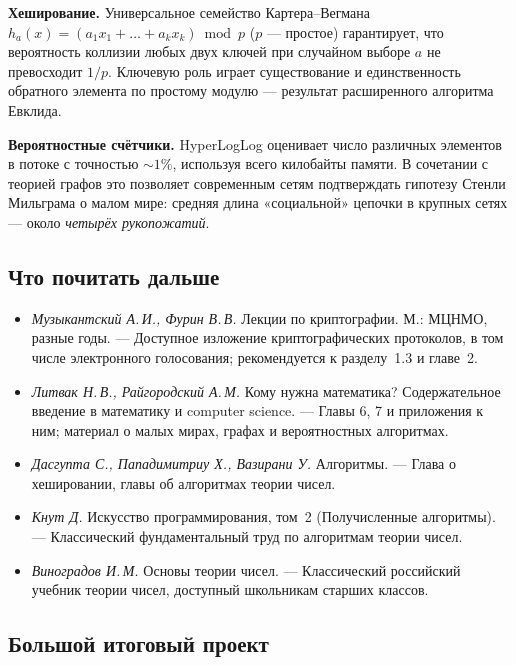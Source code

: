 \begin{tcolorbox}
\textbf{Хеширование.} Универсальное семейство Картера--Вегмана $h_a(x) = (a_1 x_1 + \dots + a_k x_k) \bmod p$ ($p$ --- простое) гарантирует, что вероятность коллизии любых двух ключей при случайном выборе $a$ не превосходит $1/p$. Ключевую роль играет существование и единственность обратного элемента по простому модулю --- результат расширенного алгоритма Евклида.

\textbf{Вероятностные счётчики.} HyperLogLog оценивает число различных элементов в потоке с точностью $\sim 1\%$, используя всего килобайты памяти. В сочетании с теорией графов это позволяет современным сетям подтверждать гипотезу Стенли Мильграма о малом мире: средняя длина «социальной» цепочки в крупных сетях --- около \emph{четырёх рукопожатий}.
\end{tcolorbox}

\subsection*{Что почитать дальше}

\begin{itemize}
  \item \emph{Музыкантский А.\,И., Фурин В.\,В.} Лекции по криптографии. М.: МЦНМО, разные годы. --- Доступное изложение криптографических протоколов, в том числе электронного голосования; рекомендуется к разделу~1.3 и главе~2.
  \item \emph{Литвак Н.\,В., Райгородский А.\,М.} Кому нужна математика? Содержательное введение в математику и computer science. --- Главы 6, 7 и приложения к ним; материал о малых мирах, графах и вероятностных алгоритмах.
  \item \emph{Дасгупта С., Пападимитриу Х., Вазирани У.} Алгоритмы. --- Глава о хешировании, главы об алгоритмах теории чисел.
  \item \emph{Кнут Д.} Искусство программирования, том~2 (Получисленные алгоритмы). --- Классический фундаментальный труд по алгоритмам теории чисел.
  \item \emph{Виноградов И.\,М.} Основы теории чисел. --- Классический российский учебник теории чисел, доступный школьникам старших классов.
\end{itemize}

\subsection*{Большой итоговый проект}

